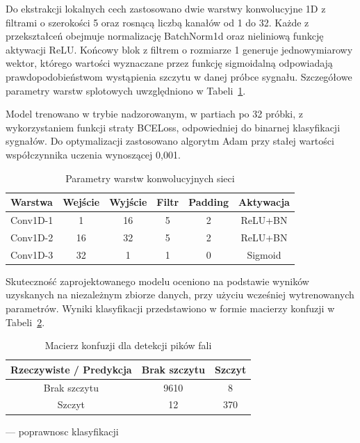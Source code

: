 \documentclass[journal]{IEEEtran}
\begin{document}
Do ekstrakcji lokalnych cech zastosowano dwie warstwy konwolucyjne 1D z filtrami o szerokości 5 oraz rosnącą liczbą kanałów od 1 do 32. Każde z przekształceń obejmuje normalizację BatchNorm1d oraz nieliniową funkcję aktywacji ReLU. Końcowy blok z filtrem o rozmiarze 1 generuje jednowymiarowy wektor, którego wartości wyznaczane przez funkcję sigmoidalną odpowiadają prawdopodobieństwom wystąpienia szczytu w danej próbce sygnału. Szczegółowe parametry warstw splotowych uwzględniono w Tabeli~\ref{tab:ppg_layers}.

Model trenowano w trybie nadzorowanym, w partiach po 32 próbki, z wykorzystaniem funkcji straty BCELoss, odpowiedniej do binarnej klasyfikacji sygnałów. Do optymalizacji zastosowano algorytm Adam przy stałej wartości współczynnika uczenia wynoszącej 0,001.

\begin{table}[ht]
\centering
\caption{Parametry warstw konwolucyjnych sieci}
\label{tab:ppg_layers}
\begin{tabular}{|l|c|c|c|c|c|}
\hline
\textbf{Warstwa} & \textbf{Wejście} & \textbf{Wyjście} & \textbf{Filtr} & \textbf{Padding} & \textbf{Aktywacja} \\
\hline
Conv1D-1 & 1 & 16 & 5 & 2 & ReLU+BN \\
Conv1D-2 & 16 & 32 & 5 & 2 & ReLU+BN \\
Conv1D-3 & 32 & 1 & 1 & 0 & Sigmoid \\
\hline
\end{tabular}
\end{table}

Skuteczność zaprojektowanego modelu oceniono na podstawie wyników uzyskanych na niezależnym zbiorze danych, przy użyciu wcześniej wytrenowanych parametrów. Wyniki klasyfikacji przedstawiono w formie macierzy konfuzji w Tabeli~\ref{tab:conf_matrix_ppg}.

\begin{table}[ht]
\centering
\caption{Macierz konfuzji dla detekcji pików fali}
\label{tab:conf_matrix_ppg}
\begin{tabular}{|c|c|c|}
\hline
\textbf{Rzeczywiste / Predykcja} & \textbf{Brak szczytu } & \textbf{Szczyt} \\
\hline
Brak szczytu  & 9610 & 8 \\
\hline
Szczyt  & 12 & 370 \\
\hline
\end{tabular}
\end{table}

--- poprawnosc klasyfikacji
\end{document}
